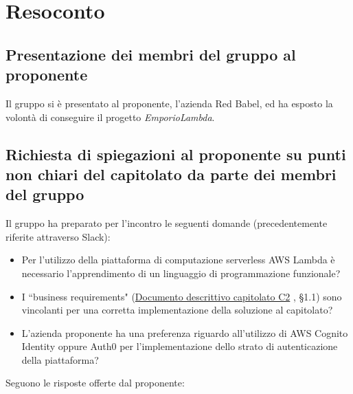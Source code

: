 \section{Resoconto}
\subsection{Presentazione dei membri del gruppo al proponente}
Il gruppo si è presentato al proponente, l'azienda Red Babel, ed ha esposto la volontà di conseguire il progetto \textit{EmporioLambda}.
\subsection{Richiesta di spiegazioni al proponente su punti non chiari del capitolato da parte dei membri del gruppo}
Il gruppo ha preparato per l'incontro le seguenti domande (precedentemente riferite attraverso Slack):
\begin{itemize}
\item Per l'utilizzo della piattaforma di computazione serverless AWS Lambda è necessario l'apprendimento di un linguaggio di programmazione funzionale?
\item I ``business requirements" (\href{https://www.math.unipd.it/~tullio/IS-1/2020/Progetto/C2.pdf}{Documento descrittivo capitolato C2} , §1.1) sono vincolanti per una corretta implementazione della soluzione al capitolato?
\item L'azienda proponente ha una preferenza riguardo all'utilizzo di AWS Cognito Identity oppure Auth0 per l'implementazione dello strato di autenticazione della piattaforma?
\end{itemize}
Seguono le risposte offerte dal proponente:
